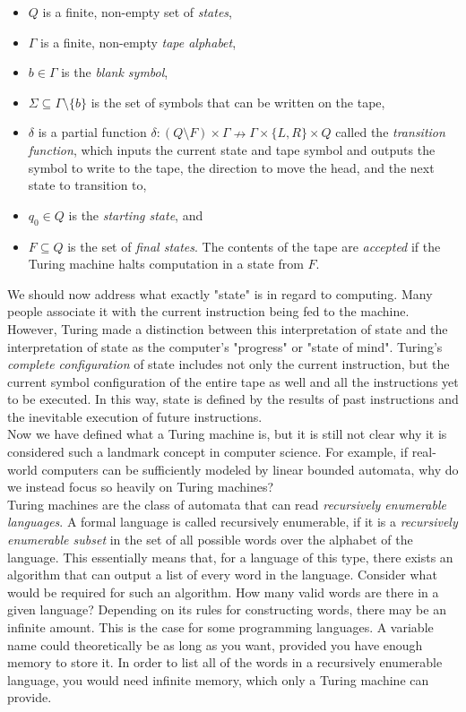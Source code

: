 \begin{itemize}
	\item $Q$ is a finite, non-empty set of \textit{states},
	\item $\Gamma$ is a finite, non-empty \textit{tape alphabet},
	\item $b\in\Gamma$ is the \textit{blank symbol},
	\item $\Sigma\subseteq\Gamma\setminus \{b\}$ is the set of symbols that can be written on the tape,
	\item $\delta$ is a partial function $\delta : (Q\setminus F)\times\Gamma\nrightarrow \Gamma\times\{L,R\}\times Q$ called the \textit{transition function}, which inputs the current state and tape symbol and outputs the symbol to write to the tape, the direction to move the head, and the next state to transition to,
	\item $q_0\in Q$ is the \textit{starting state}, and
	\item $F\subseteq Q$ is the set of \textit{final states}. The contents of the tape are \textit{accepted} if the Turing machine halts computation in a state from $F$.
\end{itemize}

We should now address what exactly "state" is in regard to computing. Many people associate it with the current instruction being fed to the machine. However, Turing made a distinction between this interpretation of state and the interpretation of state as the computer's "progress" or "state of mind". Turing's \textit{complete configuration} of state includes not only the current instruction, but the current symbol configuration of the entire tape as well and all the instructions yet to be executed. In this way, state is defined by the results of past instructions and the inevitable execution of future instructions. \\

Now we have defined what a Turing machine is, but it is still not clear why it is considered such a landmark concept in computer science. For example, if real-world computers can be sufficiently modeled by linear bounded automata, why do we instead focus so heavily on Turing machines? \\

Turing machines are the class of automata that can read \textit{recursively enumerable languages}. A formal language is called recursively enumerable, if it is a \textit{recursively enumerable subset} in the set of all possible words over the alphabet of the language. This essentially means that, for a language of this type, there exists an algorithm that can output a list of every word in the language. Consider what would be required for such an algorithm. How many valid words are there in a given language? Depending on its rules for constructing words, there may be an infinite amount. This is the case for some programming languages. A variable name could theoretically be as long as you want, provided you have enough memory to store it. In order to list all of the words in a recursively enumerable language, you would need infinite memory, which only a Turing machine can provide. \\


